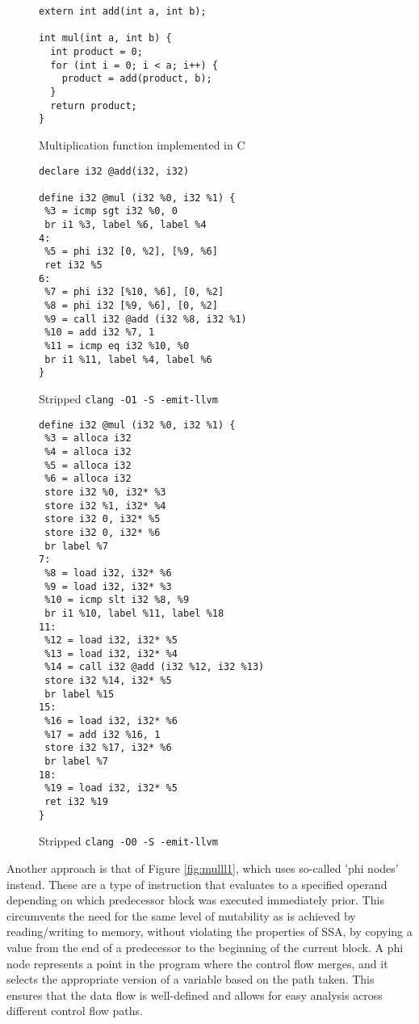 \documentclass{article}
\begin{document}
\begin{figure}[!ht]
   \begin{minipage}{0.48\textwidth}
     \centering
     \begin{verbatim}
extern int add(int a, int b);

int mul(int a, int b) {
  int product = 0;
  for (int i = 0; i < a; i++) {
    product = add(product, b);
  }
  return product;
}
     \end{verbatim}
     \caption{Multiplication function implemented in C}\label{fig:mulc}
     \vspace{2.1em}
     \begin{verbatim}
declare i32 @add(i32, i32)

define i32 @mul (i32 %0, i32 %1) {
 %3 = icmp sgt i32 %0, 0
 br i1 %3, label %6, label %4
4:
 %5 = phi i32 [0, %2], [%9, %6]
 ret i32 %5
6:
 %7 = phi i32 [%10, %6], [0, %2]
 %8 = phi i32 [%9, %6], [0, %2]
 %9 = call i32 @add (i32 %8, i32 %1)
 %10 = add i32 %7, 1
 %11 = icmp eq i32 %10, %0
 br i1 %11, label %4, label %6
}
     \end{verbatim}
     \caption{Stripped \texttt{clang -O1 -S -emit-llvm}}\label{fig:mulll1}
   \end{minipage}\hfill
   \begin{minipage}{0.48\textwidth}
     \centering
     \begin{verbatim}
define i32 @mul (i32 %0, i32 %1) {
 %3 = alloca i32
 %4 = alloca i32
 %5 = alloca i32
 %6 = alloca i32
 store i32 %0, i32* %3
 store i32 %1, i32* %4
 store i32 0, i32* %5
 store i32 0, i32* %6
 br label %7
7:
 %8 = load i32, i32* %6
 %9 = load i32, i32* %3
 %10 = icmp slt i32 %8, %9
 br i1 %10, label %11, label %18
11:
 %12 = load i32, i32* %5
 %13 = load i32, i32* %4
 %14 = call i32 @add (i32 %12, i32 %13)
 store i32 %14, i32* %5
 br label %15
15:
 %16 = load i32, i32* %6
 %17 = add i32 %16, 1
 store i32 %17, i32* %6
 br label %7
18:
 %19 = load i32, i32* %5
 ret i32 %19
}
     \end{verbatim}
     \caption{Stripped \texttt{clang -O0 -S -emit-llvm}}\label{fig:mulll0}
   \end{minipage}
\end{figure}
\noindent Another approach is that of Figure \ref{fig:mulll1}, which uses so-called 'phi nodes' instead.  These are a type of instruction that evaluates to a specified operand depending on which predecessor block was executed immediately prior. This circumvents the need for the same level of mutability as is achieved by reading/writing to memory, without violating the properties of SSA, by copying a value from the end of a predecessor to the beginning of the current block.
A phi node represents a point in the program where the control flow merges, and it selects the appropriate version of a variable based on the path taken. This ensures that the data flow is well-defined and allows for easy analysis across different control flow paths.
\end{document}
